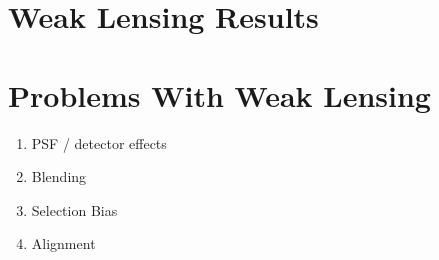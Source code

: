 \documentclass{article}
\begin{document}
\section{Weak Lensing Results}
\cite{Subaru_2019}

\section{Problems With Weak Lensing}
\cite{massey_2013}

\begin{enumerate}
    \item PSF / detector effects 
    \item Blending
    \item Selection Bias
    \item Alignment 
\end{enumerate}



\end{document}
